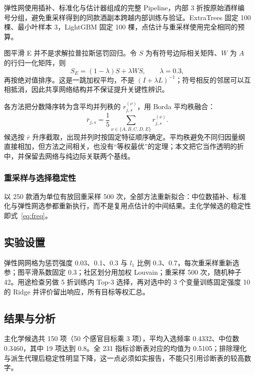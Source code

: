 \documentclass[UTF8,a4paper,zihao=-4]{ctexart}
\numberwithin{figure}{section}
\numberwithin{table}{section}
\numberwithin{equation}{section}
\begin{document}
弹性网使用插补、标准化与估计器组成的完整 Pipeline，内部 3 折按原始酒样编号分组，避免重采样得到的同款酒副本跨越内部训练与验证。ExtraTrees 固定 100 棵、最小叶样本 3，LightGBM 固定 100 棵，点估计与重采样使用完全相同的预算。

图平滑 E 并不是求解拉普拉斯惩罚回归。令 $S$ 为有符号边际相关矩阵、$W$ 为 $A$ 的行归一化矩阵，则
\begin{equation}
S_{E}=(1-\lambda)S+\lambda WS,\qquad \lambda=0.3,
\label{eq:smooth}
\end{equation}
再按绝对值排序。这是一跳加权平均，不是 $(I+\lambda L)^{-1}$；符号相反的邻居可以互相抵消，因此共享网络结构并不保证提升关键性辨识。

各方法把分数降序转为含平均并列秩的 $r^{(\nu)}_{j,s}$，用 Borda 平均秩融合：
\begin{equation}
\bar r_{j,s}=\frac{1}{5}\sum_{\nu\in\{A,B,C,D,E\}}r^{(\nu)}_{j,s}.
\label{eq:borda}
\end{equation}
候选按 $\bar r$ 升序截取，出现并列时按固定特征顺序确定。平均秩避免不同归因量纲直接相加，但方法之间相关，也没有“等权最优”的定理；本文把它当作透明的折中，并保留去网络与纯边际关联两个基线。

\subsubsection{重采样与选择稳定性}

以 250 款酒为单位有放回重采样 500 次，全部方法重新拟合：中位数插补、标准化与弹性网选参都重新执行，而不是复用点估计的中间结果。主化学候选的稳定性即式~\eqref{eq:freq}。

\subsection{实验设置}

弹性网网格为惩罚强度 0.03、0.1、0.3 与 $l_1$ 比例 0.3、0.7，每次重采样重新选参；图平滑系数固定 0.3；社区划分用加权 Louvain；重采样 500 次，随机种子 42。用途检查另做 5 折训练内 Top-3 选择，再对选中的 3 个变量训练固定强度 10 的 Ridge 并评价留出响应，所有目标等权汇总。

\subsection{结果与分析}

主化学候选共 150 项（50 个感官目标乘 3 项），平均入选频率 0.4332、中位数 0.3460，其中 19 项达到 0.8。全 231 指标诊断表对应的均值为 0.5105；排除理化与派生代理后稳定性明显下降，这一点必须如实报告，不能只引用诊断表的较高数字。
\end{document}
